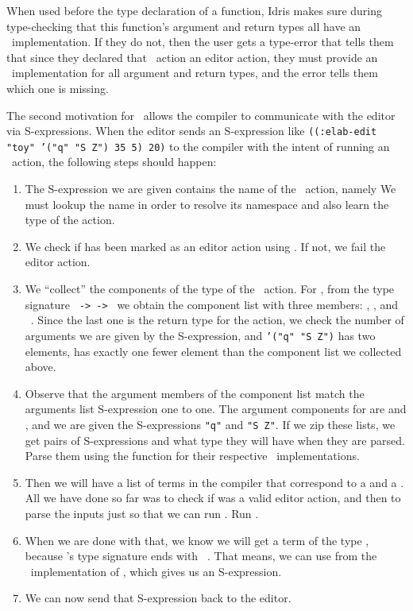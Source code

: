 When used before the type declaration of a function, Idris makes sure during
type-checking that this function's argument and return types all have an
\Editorable\ implementation. If they do not, then the user gets a type-error
that tells them that since they declared that \Elab\ action an editor action,
they must provide an \Editorable\ implementation for all argument and return
types, and the error tells them which one is missing.

The second motivation for \Editorable\ allows the compiler to communicate with
the editor via S-expressions. When the editor sends an S-expression like
\texttt{((:elab-edit "toy" '("q" "S Z") 35 5) 20)} to the
compiler with the intent of running an \Elab\ action,
the following steps should happen:
\begin{enumerate}
  \item The S-expression we are given contains the name of the \Elab\ action,
    namely  We must lookup the name in order to resolve its namespace
    and also learn the type of the action.
  \item We check if  has been marked as an editor action using
    . If not, we fail the editor action.
  \item We ``collect'' the components of the type of the \Elab\ action. For
    , from the type signature \texttt{ ->  ->
     } we obtain the component list with three members: , \TT,
    and \Elab\ \TT.
    Since the last one is the return type for the action, we check the number
    of arguments we are given by the S-expression, and \texttt{'("q" "S Z")}
    has two elements, has exactly one fewer element than the component list we
    collected above.
  \item Observe that the argument members of the component list match the
    arguments list S-expression one to one. The argument components for
     are  and \TT, and we are given the S-expressions
    \texttt{"q"} and \texttt{"S Z"}. If we zip these lists, we get pairs of
    S-expressions and what type they will have when they are parsed.
    Parse them using the  function for their respective
    \Editorable\ implementations.
  \item Then we will have a list of terms in the compiler that correspond to a
     and a \TT.  All we have done so far was to check if 
    was a valid editor action, and then to parse the inputs just so that we can
    run . Run .
  \item When we are done with that, we know we will get a term of the type \TT,
    because 's type signature ends with \texttt{\Elab\ \TT}. That means,
    we can use  from the \Editorable\ implementation of \TT, which
    gives us an S-expression.
  \item We can now send that S-expression back to the editor.
\end{enumerate}

